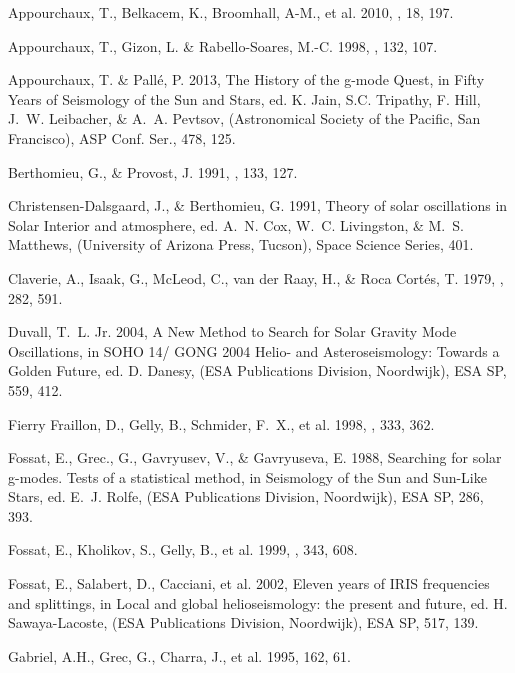 \documentclass[bibyear]{aa}
\begin{document}
\begin{thebibliography}{}

  Appourchaux, T., Belkacem, K., Broomhall, A-M., et al. 2010, {\aapr}, 18, 197.  

   Appourchaux, T., Gizon, L. \& Rabello-Soares, M.-C. 1998, {\aaps}, 132, 107.
 
   Appourchaux, T. \& Pall\'e, P. 2013, The History of the g-mode Quest, in Fifty Years of Seismology of the Sun and Stars, ed. K. Jain, S.C. Tripathy, F. Hill, J.~W. Leibacher, \& A.~A. Pevtsov, (Astronomical Society of the Pacific, San Francisco), ASP Conf. Ser., 478, 125.

     Berthomieu, G., \& Provost, J. 1991, {\solphys}, 133, 127.
  
      Christensen-Dalsgaard, J., \&  Berthomieu, G. 1991, Theory of solar oscillations in Solar Interior and atmosphere, ed. A.~N. Cox, W.~C. Livingston, \& M.~S. Matthews, (University of Arizona Press, Tucson), Space Science Series, 401.
   
    Claverie, A., Isaak, G., McLeod, C., van der Raay, H., \& Roca Cort\'es, T. 1979, {\nat}, 282, 591.
 
     Duvall, T.~L. Jr.  2004, A New Method to Search for Solar Gravity Mode Oscillations, in SOHO 14/ GONG 2004 Helio- and Asteroseismology: Towards a Golden Future, ed. D. Danesy, (ESA Publications Division, Noordwijk), ESA SP, 559, 412.

      Fierry Fraillon, D., Gelly, B., Schmider, F.~X.,
et al. 1998, {\aap}, 333, 362.
    
     Fossat, E., Grec., G., Gavryusev, V., \& Gavryuseva, E. 1988, Searching for solar g-modes. Tests of a statistical method, in Seismology of the Sun and Sun-Like Stars, ed. E.~J. Rolfe, (ESA Publications Division, Noordwijk), ESA SP, 286, 393.  

      Fossat, E., Kholikov, S., Gelly, B., et al. 1999, {\aap}, 343, 608.    
 
 Fossat, E., Salabert, D., Cacciani, et al. 2002, Eleven years of IRIS frequencies and splittings, in Local and global helioseismology: the present and future, ed. H. Sawaya-Lacoste, (ESA Publications Division, Noordwijk), ESA SP, 517, 139. 

  Gabriel, A.H., Grec, G., Charra, J., et al. 1995,
{\solphys} 162, 61.


\end{thebibliography}
\end{document}
